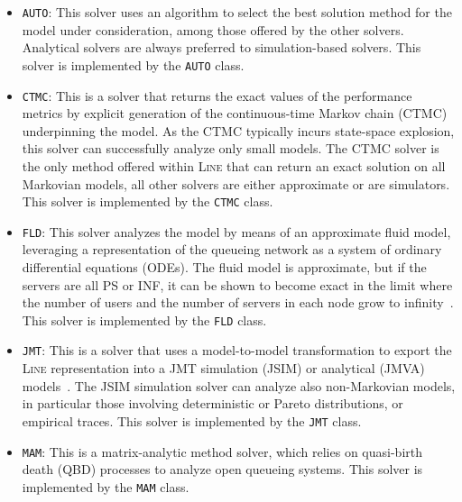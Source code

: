 \begin{itemize}
\item \texttt{AUTO}: This solver uses an algorithm to select the best solution method for the model under consideration, among those offered by the other solvers. Analytical solvers are always preferred to simulation-based solvers. This solver is implemented by the \texttt{AUTO} class.
\item \texttt{CTMC}: This is a solver that returns the exact values of the performance metrics by explicit generation of the continuous-time Markov chain (CTMC) underpinning the model. As the CTMC typically incurs state-space explosion, this solver can successfully analyze only small models. The {CTMC} solver is the only method offered within \textsc{Line} that can return an exact solution on all Markovian models, all other solvers are either approximate or are simulators. This solver is implemented by the \texttt{CTMC} class.
\item \texttt{FLD}: This solver analyzes the model by means of an approximate fluid model, leveraging a representation of the queueing network as a system of ordinary differential equations (ODEs). The fluid model is approximate, but if the servers are all PS or INF, it can be shown to become exact in the limit where the number of users and the number of servers in each node grow to infinity~\cite{pere.casa13}. This solver is implemented by the \texttt{FLD} class.
\item \texttt{JMT}: This is a solver that uses a model-to-model transformation to export the \textsc{Line} representation into a JMT simulation (JSIM) or analytical (JMVA) models~\cite{BerCS07}. The JSIM simulation solver can analyze also non-Markovian models, in particular those involving deterministic or Pareto distributions, or empirical traces. This solver is implemented by the \texttt{JMT} class.
\item \texttt{MAM}: This is a matrix-analytic method solver, which relies on quasi-birth death (QBD) processes to analyze open queueing systems. This solver is implemented by the \texttt{MAM} class.

\end{itemize}
